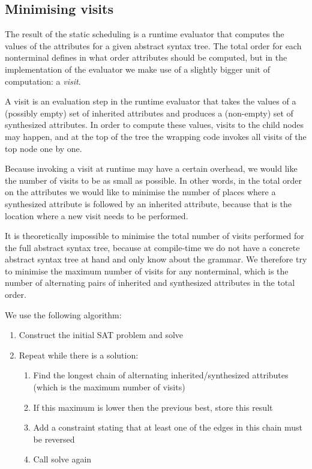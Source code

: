 \documentclass{llncs}
\begin{document}
\subsection{Minimising visits} \label{sect:minimising}
The result of the static scheduling is a runtime evaluator that computes the values of the attributes for a given abstract syntax tree. The total order for each nonterminal defines in what order attributes should be computed, but in the implementation of the evaluator we make use of a slightly bigger unit of computation: a \emph{visit}.

A visit is an evaluation step in the runtime evaluator that takes the values of a (possibly empty) set of inherited attributes and produces a (non-empty) set of synthesized attributes. In order to compute these values, visits to the child nodes may happen, and at the top of the tree the wrapping code invokes all visits of the top node one by one.

Because invoking a visit at runtime may have a certain overhead, we would like the number of visits to be as small as possible. In other words, in the total order on the attributes we would like to minimise the number of places where a synthesized attribute is followed by an inherited attribute, because that is the location where a new visit needs to be performed.

It is theoretically impossible to minimise the total number of visits performed for the full abstract syntax tree, because at compile-time we do not have a concrete abstract syntax tree at hand and only know about the grammar. We therefore try to minimise the maximum number of visits for any nonterminal, which is the number of alternating pairs of inherited and synthesized attributes in the total order.

We use the following algorithm:
\begin{enumerate}
\item Construct the initial SAT problem and solve
\item Repeat while there is a solution:
\begin{enumerate}
\item Find the longest chain of alternating inherited/synthesized attributes (which is the maximum number of visits)
\item If this maximum is lower then the previous best, store this result
\item Add a constraint stating that at least one of the edges in this chain must be reversed
\item Call solve again
\end{enumerate}
\end{enumerate}
\end{document}
